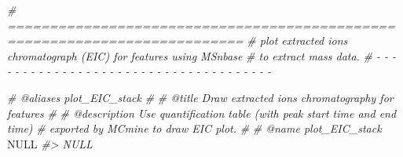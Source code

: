 \documentclass[
]{article}
\newenvironment{Shaded}{\begin{snugshade}}{\end{snugshade}}
\newcommand{\CommentTok}[1]{\textcolor[rgb]{0.56,0.35,0.01}{\textit{#1}}}
\newcommand{\ConstantTok}[1]{\textcolor[rgb]{0.00,0.00,0.00}{#1}}
\begin{document}
\begin{Shaded}
\begin{Highlighting}[]
\CommentTok{\# ==========================================================================}
\CommentTok{\# plot extracted ions chromatograph (EIC) for features using \textasciigrave{}MSnbase\textasciigrave{}}
\CommentTok{\# to extract mass data.}
\CommentTok{\# {-} {-} {-} {-} {-} {-} {-} {-} {-} {-} {-} {-} {-} {-} {-} {-} {-} {-} {-} {-} {-} {-} {-} {-} {-} {-} {-} {-} {-} {-} {-} {-} {-} {-} {-} {-} {-}}

\CommentTok{\#\textquotesingle{} @aliases plot\_EIC\_stack}
\CommentTok{\#\textquotesingle{}}
\CommentTok{\#\textquotesingle{} @title Draw extracted ions chromatography for \textquotesingle{}features\textquotesingle{}}
\CommentTok{\#\textquotesingle{}}
\CommentTok{\#\textquotesingle{} @description Use quantification table (with peak start time and end time)}
\CommentTok{\#\textquotesingle{} exported by MCmine to draw EIC plot.}
\CommentTok{\#\textquotesingle{}}
\CommentTok{\#\textquotesingle{} @name plot\_EIC\_stack}
\ConstantTok{NULL}
\CommentTok{\#\textgreater{} NULL}


\end{Highlighting}
\end{Shaded}
\end{document}
